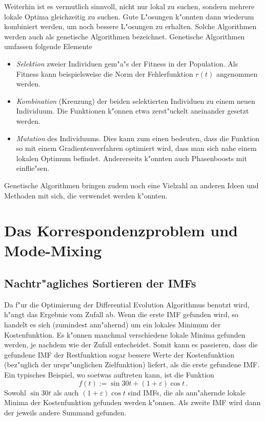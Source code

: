 \documentclass[a4paper]{scrartcl}
\begin{document}
Weiterhin ist es vermutlich sinnvoll, nicht nur lokal zu suchen, sondern mehrere lokale Optima gleichzeitig zu suchen. Gute L"osungen k"onnten dann wiederum kombiniert werden, um noch bessere L"osungen zu erhalten. Solche Algorithmen werden auch als genetische Algorithmen bezeichnet. Genetische Algorithmen umfassen folgende Elemente
\begin{itemize}
  \item {\em Selektion} zweier Individuen gem"a"s der Fitness in der Population. Als Fitness kann beispielsweise die Norm der Fehlerfunktion $r(t)$ angenommen werden.  
  \item {\em Kombination} (Kreuzung) der beiden selektierten Individuen zu einem neuen Individuum. Die Funktionen k"onnen etwa zerst"uckelt aneinander gesetzt werden.
  \item {\em Mutation} des Individuums. Dies kann zum einen bedeuten, dass die Funktion so mit einem Gradientenverfahren optimiert wird, dass man sich nahe einem lokalen Optimum befindet. Andererseits k"onnten auch Phasenboosts mit einflie"sen. 
\end{itemize}
Genetische Algorithmen bringen zudem noch eine Vielzahl an anderen Ideen und Methoden mit sich, die verwendet werden k"onnten. 


\section{Das Korrespondenzproblem und Mode-Mixing}

\subsection{Nachtr"agliches Sortieren der IMFs}

Da f"ur die Optimierung der Differential Evolution Algorithmus benutzt wird, h"angt das Ergebnis vom Zufall ab. Wenn die erste IMF gefunden wird, so handelt es sich (zumindest ann"ahernd) um ein lokales Minimum der Kostenfunktion. Es k"onnen manchmal verschiedene lokale Minima gefunden werden, je nachdem wie der Zufall entscheidet. Somit kann es passieren, dass die gefundene IMF der Restfunktion sogar bessere Werte der Kostenfunktion (bez"uglich der urspr"unglichen Zielfunktion) liefert, als die erste gefundene IMF. Ein typisches Beispiel, wo soetwas auftreten kann, ist die Funktion
$$ f(t) := \sin 30t + (1+\varepsilon)\cos t\,. $$
Sowohl $\sin 30t$ als auch $(1+\varepsilon)\cos t$ sind IMFs, die als ann"ahernde lokale Minima der Kostenfunktion gefunden werden k"onnen. Als zweite IMF wird dann der jeweils andere Summand gefunden. 
\end{document}
